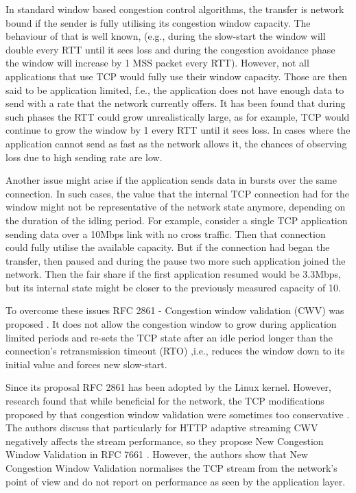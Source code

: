 \documentclass[10pt,sigconf]{acmart}
\begin{document}
In standard window based congestion control algorithms, the transfer is network bound if the sender is fully utilising its congestion window capacity. The behaviour of that is well known, (e.g., during the slow-start the window will double every RTT until it sees loss and during the congestion avoidance phase the window will increase by 1 MSS packet every RTT). However, not all applications that use TCP would fully use their window capacity. Those are then said to be application limited, f.e., the application does not have enough data to send with a rate that the network currently offers. It has been found that during such phases the RTT could grow unrealistically large, as for example, TCP would continue to grow the window by 1 every RTT until it sees loss. In cases where the application cannot send as fast as the network allows it, the chances of observing loss due to high sending rate are low.

Another issue might arise if the application sends data in bursts over the same connection. In such cases, the value that the internal TCP connection had for the window might not be representative of the network state anymore, depending on the duration of the idling period. For example, consider a single TCP application sending data over a 10Mbps link with no cross traffic. Then that connection could fully utilise the available capacity. But if the connection had began the transfer, then paused and during the pause two more such application joined the network. Then the fair share if the first application resumed would be 3.3Mbps, but its internal state might be closer to the previously measured capacity of 10.

To overcome these issues RFC 2861 - Congestion window validation (CWV) was proposed \cite{rfc2861-2000-padhye-congestion-window-validation}. It does not allow the congestion window to grow during application limited periods and re-sets the TCP state after an idle period longer than the connection's retransmission timeout (RTO) ,i.e., reduces the window down to its initial value and forces new slow-start.

Since its proposal RFC 2861 has been adopted by the Linux kernel. However, research found that while beneficial for the network, the TCP modifications proposed by that congestion window validation were sometimes too conservative \cite{Nazir-2014-performance-evaluation-congestion-window-validation-dash-newcwv}. The authors discuss that particularly for HTTP adaptive streaming CWV negatively affects the stream performance, so they propose New Congestion Window Validation in RFC 7661 \cite{rfc7661-2015-fairhurst-new-cwnd-validation}. However, the authors show that New Congestion Window Validation normalises the TCP stream from the network's point of view and do not report on performance as seen by the application layer.
\end{document}
